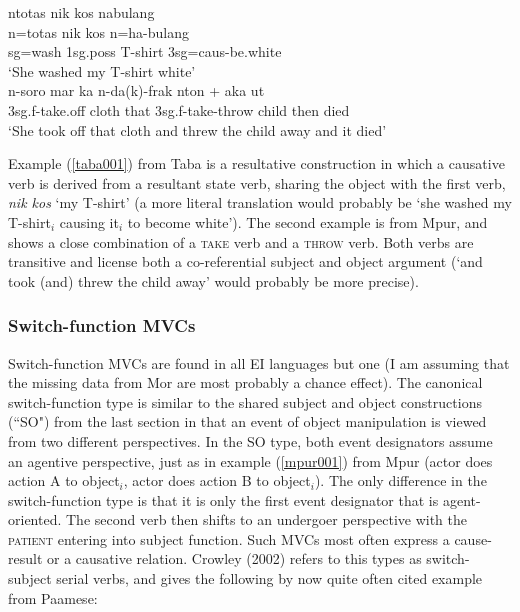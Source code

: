 \ea \label{taba001}
\gll ntotas nik kos nabulang \\
n=totas nik kos n=ha-bulang \\
\acs{sg}=wash 1\acs{sg}.\acs{poss} T-shirt 3\acs{sg}=\acs{caus}-be.white \\
\glft `She washed my T-shirt white' \\ 
\z
\xe
\ea \label{mpur001}
\gll n-soro mar ka n-da(k)-frak nton + aka ut \\
3\acs{sg}.\acs{f}-take.off cloth that 3\acs{sg}.\acs{f}-take-throw child then died \\
\glft `She took off that cloth and threw the child away and it died' \\ 
\z
\xe

Example (\ref{taba001}) from Taba is a resultative construction in which a causative verb is derived from a resultant state verb, sharing the object with the first verb, \textit{nik kos} `my T-shirt' (a more literal translation would probably be `she washed my T-shirt$_i$ causing it$_i$ to become white'). The second example is from Mpur, and shows a close combination of a \textsc{take} verb and a \textsc{throw} verb. Both verbs are transitive and license both a co-referential subject and object argument (`and took (and) threw the child away' would probably be more precise).

\subsubsection{Switch-function MVCs}

Switch-function MVCs are found in all EI languages but one (I am assuming that the missing data from Mor are most probably a chance effect). The canonical switch-function type is similar to the shared subject and object constructions (``SO") from the last section in that an event of object manipulation is viewed from two different perspectives. In the SO type, both event designators assume an agentive perspective, just as in example (\ref{mpur001}) from Mpur (actor does action A to object$_i$, actor does action B to object$_i$). The only difference in the switch-function type is that it is only the first event designator that is agent-oriented. The second verb then shifts to an undergoer perspective with the \textsc{patient} entering into subject function. Such MVCs most often express a cause-result or a causative relation. Crowley (2002) refers to this types as switch-subject serial verbs, and gives the following by now quite often cited example from Paamese:

